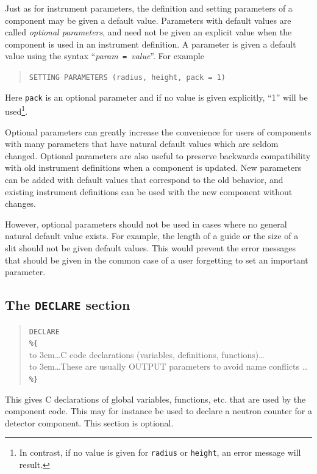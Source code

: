 Just as for instrument parameters, the definition and setting parameters of a
component may be given a default value. Parameters with default values are
called \emph{optional parameters}, and need not be given an explicit value when
the component is used in an instrument definition. A parameter is given a
default value using the syntax ``\textit{param}\texttt{ = }\textit{value}''.
For example
\begin{quote}
  \texttt{SETTING PARAMETERS (radius, height, pack = 1)}
\end{quote}
Here \verb+pack+ is an optional parameter and if no value is given
explicitly, ``1'' will be used\footnote{In contrast, if no value is
  given for \texttt{radius} or \texttt{height}, an error message will
  result.}.

Optional parameters can greatly increase the convenience for users of
components with many parameters that have natural default values which
are seldom changed. Optional parameters are also useful to preserve
backwards compatibility with old instrument definitions when a component
is updated. New parameters can be added with default values that
correspond to the old behavior, and existing instrument definitions can
be used with the new component without changes.

However, optional parameters should not be used in cases where no
general natural default value exists. For example, the length of a guide
or the size of a slit should not be given default values. This would
prevent the error messages that should be given in the common case of a
user forgetting to set an important parameter.


\subsection{The \texttt{DECLARE} section}
\label{s:comp-declare}
\begin{quote}
  \texttt{DECLARE} \\
  \verb|%{| \\
  \hbox to 3em{}\ldots C code declarations (variables, definitions, functions)\ldots \\
  \hbox to 3em{}\ldots These are usually OUTPUT parameters to avoid name conflicts \ldots \\
  \verb|%}|
\end{quote}
This gives C declarations of global variables, functions, etc. that are used by the
component code. This may for instance be used to declare a neutron
counter for a detector component. This section is optional.

